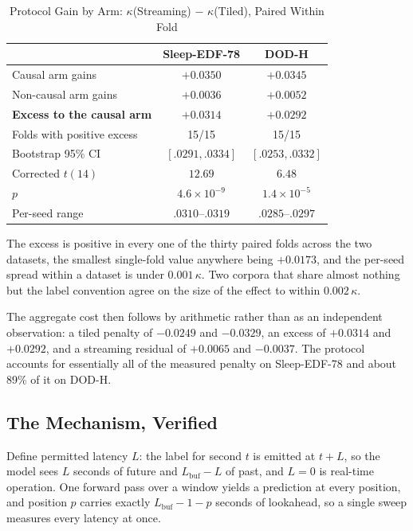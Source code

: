 \documentclass[conference]{IEEEtran}
\begin{document}
\begin{table}[t]
\caption{Protocol Gain by Arm: $\kappa$(Streaming) $-$ $\kappa$(Tiled), Paired Within Fold}
\label{tab:asym}
\centering
\footnotesize
\setlength{\tabcolsep}{5pt}
\begin{tabular}{lcc}
\toprule
 & Sleep-EDF-78 & DOD-H \\
\midrule
Causal arm gains       & $+0.0350$ & $+0.0345$ \\
Non-causal arm gains   & $+0.0036$ & $+0.0052$ \\
\midrule
\textbf{Excess to the causal arm} & $\mathbf{+0.0314}$ & $\mathbf{+0.0292}$ \\
Folds with positive excess & 15/15 & 15/15 \\
Bootstrap 95\% CI & $[.0291, .0334]$ & $[.0253, .0332]$ \\
Corrected $t(14)$ & $12.69$ & $6.48$ \\
$p$ & $4.6\times10^{-9}$ & $1.4\times10^{-5}$ \\
Per-seed range & $.0310$--$.0319$ & $.0285$--$.0297$ \\
\bottomrule
\end{tabular}
\end{table}

The excess is positive in every one of the thirty paired folds across the two datasets, the
smallest single-fold value anywhere being $+0.0173$, and the per-seed spread within a dataset is
under $0.001\,\kappa$. Two corpora that share almost nothing but the label convention agree on the
size of the effect to within $0.002\,\kappa$.

The aggregate cost then follows by arithmetic rather than as an independent observation: a tiled
penalty of $-0.0249$ and $-0.0329$, an excess of $+0.0314$ and $+0.0292$, and a streaming residual
of $+0.0065$ and $-0.0037$. The protocol accounts for essentially all of the measured penalty on
Sleep-EDF-78 and about 89\% of it on DOD-H.

\subsection{The Mechanism, Verified}
\label{sec:latency}

Define permitted latency $L$: the label for second $t$ is emitted at $t + L$, so the model sees $L$
seconds of future and $L_{\text{buf}} - L$ of past, and $L = 0$ is real-time operation. One forward
pass over a window yields a prediction at every position, and position $p$ carries exactly
$L_{\text{buf}} - 1 - p$ seconds of lookahead, so a single sweep measures every latency at once.
\end{document}
